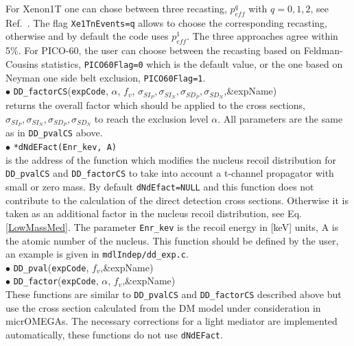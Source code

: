 \documentclass[12pt,a4paper]{article}
\begin{document}
For  Xenon1T one can chose  between  three recasting, $p_{eff}^{q}$ with $q=0,1,2$, 
see Ref.~\cite{Belanger:2020gnr}. The  flag {\tt Xe1TnEvents=q} allows to choose the  corresponding recasting,  otherwise and by default the code uses  $p_{eff}^1$. The three approaches agree  within 5\%. For PICO-60, the user can choose between the recasting based on Feldman-Cousins statistics, {\tt PICO60Flag=0} 
which is the default value, or the one based on  Neyman one side belt exclusion, {\tt PICO60Flag=1}.\\ 



\noindent
$\bullet$ \verb|DD_factorCS|(\verb|expCode|, $\alpha$, $f_v$, $\sigma_{SI_P},\sigma_{SI_N},\sigma_{SD_P},\sigma_{SD_N}$,\&expName)\\ 
returns the overall factor which should be applied to the cross sections, $\sigma_{SI_P},\sigma_{SI_N},\sigma_{SD_P}, \sigma_{SD_N}$ to reach  the exclusion level $\alpha$.  
All parameters are the same as in {\tt DD\_pvalCS} above. \\

\noindent
$\bullet$ \verb|*dNdEFact(Enr_kev, A)|\\
is the address of the function which modifies the nucleus recoil distribution  for {\tt DD\_pvalCS}
and {\tt DD\_factorCS}   to take into account a 
t-channel propagator  with  small or zero mass.  By default \verb|dNdEfact=NULL| and this 
function does not contribute to  the calculation of the direct detection cross sections. Otherwise  it is taken as an additional factor 
in the nucleus recoil distribution, see Eq.\ref{LowMassMed}.  
The parameter {\tt Enr\_kev} is the recoil energy in [keV] units, A is the  atomic number of the nucleus. This function should be defined by the user, an example is given in 
\verb|mdlIndep/dd_exp.c|.\\

\noindent
$\bullet$ \verb|DD_pval|(\verb|expCode|, $f_v$,\&expName)\\
$\bullet$  \verb|DD_factor|(\verb|expCode|, $\alpha$, $f_v$,\&expName)\\     
These functions are similar to  \verb|DD_pvalCS| and \verb|DD_factorCS| described above but use the  cross section calculated from the DM model under consideration in 
micrOMEGAs.  The necessary corrections for a light mediator are implemented automatically, these functions do not use {\tt dNdEFact}. \\
\end{document}
